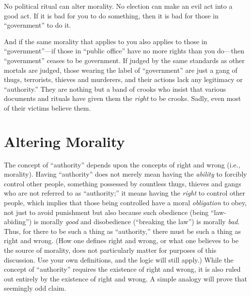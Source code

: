 \documentclass{book}
\begin{document}
No political ritual can alter morality. No election can make an evil act into a good act. If it is bad for you to do something, then it is bad for those in \enquote{government} to do it.

And if the same morality that applies to you also applies to those in \enquote{government}---if those in \enquote{public office} have no more rights than you do---then \enquote{government} ceases to be government. If judged by the same standards as other mortals are judged, those wearing the label of \enquote{government} are just a gang of thugs, terrorists, thieves and murderers, and their actions lack any legitimacy or \enquote{authority.} They are nothing but a band of crooks who insist that various documents and rituals have given them the \emph{right} to be crooks. Sadly, even most of their victims believe them.

\section{Altering Morality}

The concept of \enquote{authority} depends upon the concepts of right and wrong (i.e., morality). Having \enquote{authority} does not merely mean having the \emph{ability} to forcibly control other people, something possessed by countless thugs, thieves and gangs who are not referred to as \enquote{authority;} it means having the \emph{right} to control other people, which implies that those being controlled have a moral \emph{obligation} to obey, not just to avoid punishment but also because such obedience (being \enquote{law-abiding}) is morally \emph{good} and disobedience (\enquote{breaking the law}) is morally \emph{bad}. Thus, for there to be such a thing as \enquote{authority,} there must be such a thing as right and wrong. (How one defines right and wrong, or what one believes to be the source of morality, does not particularly matter for purposes of this discussion. Use your own definitions, and the logic will still apply.) While the concept of \enquote{authority} requires the existence of right and wrong, it is also ruled out entirely by the existence of right and wrong. A simple analogy will prove that seemingly odd claim.
\end{document}
